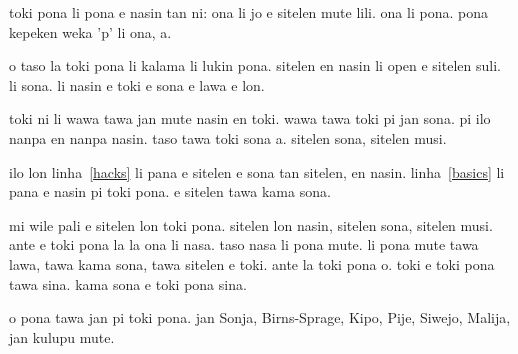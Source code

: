 \documentclass{article}
\begin{document}
toki pona li pona e nasin tan ni:
ona li jo e sitelen mute lili.
ona li pona.
pona kepeken weka 'p' li ona, a.

o taso la toki pona li kalama li lukin pona.
sitelen en nasin li open e sitelen suli\cite{tpLang,pije,fb1,fb2,tokisona,Wikipesija}.
li sona. li nasin e toki e sona e lawa e lon.

toki ni li wawa tawa jan mute nasin en toki.
wawa tawa toki pi jan sona.
pi ilo nanpa en nanpa nasin.
taso tawa toki sona a.
sitelen sona, sitelen musi.

ilo lon linha~\ref{hacks} li pana e sitelen
e sona tan sitelen,
en nasin.
linha~\ref{basics} li pana e nasin pi toki pona.
e sitelen tawa kama sona.

mi wile pali e sitelen lon toki pona.
sitelen lon nasin, sitelen sona,
sitelen musi.
ante e toki pona la
la ona li nasa.
taso nasa li pona mute.
li pona mute tawa lawa,
tawa kama sona, tawa sitelen e toki.
ante la toki pona o.
toki e toki pona tawa sina.
kama sona e toki pona sina.

o pona tawa jan pi toki pona.
jan Sonja, Birns-Sprage, Kipo, Pije,
Siwejo, Malija, jan kulupu mute.
\end{document}
